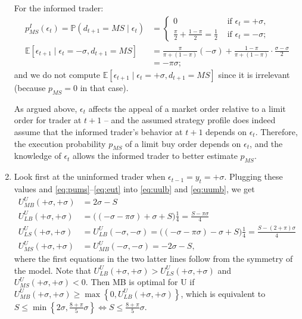 \documentclass[a4paper]{article}
\begin{document}
\begin{enumerate}
	For the informed trader:
	\begin{align}
		p_{MS}^I(\epsilon_t) = \mathbb{P}(d_{t+1}=MS \mid \epsilon_t) &= \begin{cases}
			0 & \text{ if } \epsilon_t = +\sigma,
			\\
			\frac{\pi}{2}+\frac{1-\pi}{2} = \frac{1}{2} & \text{ if } \epsilon_t = -\sigma;
		\end{cases}
		\label{eq:pims}
		\\
		\mathbb{E}[\epsilon_{t+1} \mid \epsilon_t=-\sigma, d_{t+1}=MS] &= \frac{\pi}{\pi + (1-\pi)} (-\sigma) + \frac{1-\pi}{\pi + (1-\pi)} \cdot \frac{\sigma-\sigma}{2}
		\nonumber
		\\
		&= -\pi \sigma;
		\label{eq:eit}
	\end{align}
	and we do not compute $\mathbb{E}[\epsilon_{t+1} \mid \epsilon_t=+\sigma, d_{t+1}=MS]$ since it is irrelevant (because $p_{MS}=0$ in that case).
	
	As argued above, $\epsilon_t$ affects the appeal of a market order relative to a limit order for trader at $t+1$ -- and the assumed strategy profile does indeed assume that the informed trader's behavior at $t+1$ depends on $\epsilon_t$. Therefore, the execution probability $p_{MS}$ of a limit buy order depends on $\epsilon_t$, and the knowledge of $\epsilon_t$ allows the informed trader to better estimate $p_{MS}$.
	
	\item Look first at the uninformed trader when $\epsilon_{t-1} = y_t = +\sigma$. Plugging these values and \eqref{eq:pums}--\eqref{eq:eut} into \eqref{eq:uulb} and \eqref{eq:uumb}, we get
	\begin{align*}
		U^U_{MB}(+\sigma, +\sigma) &= 2 \sigma - S
		\\
		U^U_{LB}(+\sigma, +\sigma) &= \Big( (-\sigma-\pi\sigma)+ \sigma + S \Big) \frac{1}{4} = \frac{S - \pi \sigma}{4}
		\\
		U^U_{LS}(+\sigma, +\sigma) &= U^U_{LB}(-\sigma, -\sigma) = \Big( (-\sigma-\pi\sigma)- \sigma + S \Big) \frac{1}{4} = \frac{S - (2+\pi) \sigma}{4}
		\\
		U^U_{MS}(+\sigma, +\sigma) &= U^U_{MB}(-\sigma, -\sigma) = -2\sigma - S,
	\end{align*}
	where the first equations in the two latter lines follow from the symmetry of the model. Note that $U^U_{LB}(+\sigma, +\sigma)>U^U_{LS}(+\sigma, +\sigma)$ and $U^U_{MS}(+\sigma, +\sigma) < 0$. Then MB is optimal for U if $U^U_{MB}(+\sigma, +\sigma) \geq \max \left\{ 0, U^U_{LB}(+\sigma, +\sigma) \right\}$, which is equivalent to $S \leq \min \left\{ 2\sigma, \frac{8+\pi}{5}\sigma \right\} \iff S \leq \frac{8+\pi}{5}\sigma$.
	

\end{enumerate}
\end{document}
